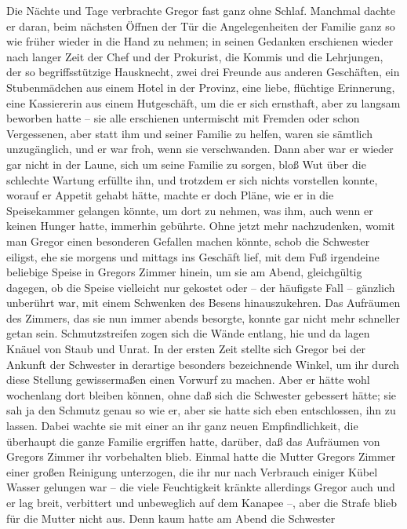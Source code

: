 Die Nächte und Tage verbrachte Gregor fast ganz ohne Schlaf. Manchmal
dachte er daran, beim nächsten Öffnen der Tür die Angelegenheiten der
Familie ganz so wie früher wieder in die Hand zu nehmen; in seinen
Gedanken erschienen wieder nach langer Zeit der Chef und der Prokurist,
die Kommis und die Lehrjungen, der so begriffsstützige Hausknecht, zwei
drei Freunde aus anderen Geschäften, ein Stubenmädchen aus einem Hotel
in der Provinz, eine liebe, flüchtige Erinnerung, eine Kassiererin aus
einem Hutgeschäft, um die er sich ernsthaft, aber zu langsam beworben
hatte -- sie alle erschienen untermischt mit Fremden oder schon
Vergessenen, aber statt ihm und seiner Familie zu helfen, waren sie
sämtlich unzugänglich, und er war froh, wenn sie verschwanden. Dann aber
war er wieder gar nicht in der Laune, sich um seine Familie zu sorgen,
bloß Wut über die schlechte Wartung erfüllte ihn, und trotzdem er sich
nichts vorstellen konnte, worauf er Appetit gehabt hätte, machte er doch
Pläne, wie er in die Speisekammer gelangen könnte, um dort zu nehmen,
was ihm, auch wenn er keinen Hunger hatte, immerhin gebührte. Ohne jetzt
mehr nachzudenken, womit man Gregor einen besonderen Gefallen machen
könnte, schob die Schwester eiligst, ehe sie morgens und mittags ins
Geschäft lief, mit dem Fuß irgendeine beliebige Speise in Gregors Zimmer
hinein, um sie am Abend, gleichgültig dagegen, ob die Speise vielleicht
nur gekostet oder -- der häufigste Fall -- gänzlich unberührt war, mit
einem Schwenken des Besens hinauszukehren. Das Aufräumen des Zimmers,
das sie nun immer abends besorgte, konnte gar nicht mehr schneller getan
sein. Schmutzstreifen zogen sich die Wände entlang, hie und da lagen
Knäuel von Staub und Unrat. In der ersten Zeit stellte sich Gregor bei
der Ankunft der Schwester in derartige besonders bezeichnende Winkel, um
ihr durch diese Stellung gewissermaßen einen Vorwurf zu machen. Aber er
hätte wohl wochenlang dort bleiben können, ohne daß sich die Schwester
gebessert hätte; sie sah ja den Schmutz genau so wie er, aber sie hatte
sich eben entschlossen, ihn zu lassen. Dabei wachte sie mit einer an ihr
ganz neuen Empfindlichkeit, die überhaupt die ganze Familie ergriffen
hatte, darüber, daß das Aufräumen von Gregors Zimmer ihr vorbehalten
blieb. Einmal hatte die Mutter Gregors Zimmer einer großen Reinigung
unterzogen, die ihr nur nach Verbrauch einiger Kübel Wasser gelungen war
-- die viele Feuchtigkeit kränkte allerdings Gregor auch und er lag
breit, verbittert und unbeweglich auf dem Kanapee --, aber die Strafe
blieb für die Mutter nicht aus. Denn kaum hatte am Abend die Schwester
